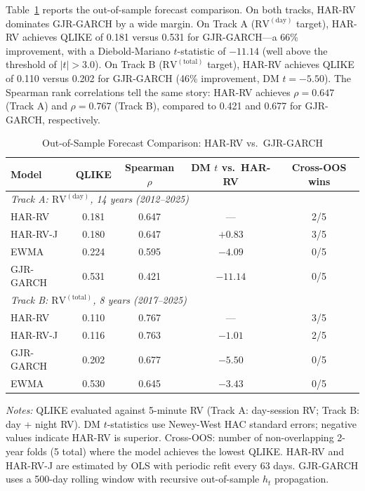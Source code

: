 Table~\ref{tab:har_comparison} reports the out-of-sample forecast comparison. On both tracks, HAR-RV dominates GJR-GARCH by a wide margin. On Track A ($\text{RV}^{(\text{day})}$ target), HAR-RV achieves QLIKE of 0.181 versus 0.531 for GJR-GARCH---a 66\% improvement, with a Diebold-Mariano $t$-statistic of $-11.14$ (well above the \citealt{harvey2016} threshold of $|t| > 3.0$). On Track B ($\text{RV}^{(\text{total})}$ target), HAR-RV achieves QLIKE of 0.110 versus 0.202 for GJR-GARCH (46\% improvement, DM $t = -5.50$). The Spearman rank correlations tell the same story: HAR-RV achieves $\rho = 0.647$ (Track A) and $\rho = 0.767$ (Track B), compared to 0.421 and 0.677 for GJR-GARCH, respectively.

\begin{table}[H]
\centering
\caption{Out-of-Sample Forecast Comparison: HAR-RV vs.\ GJR-GARCH}
\label{tab:har_comparison}
\begin{tabular}{lcccc}
\toprule
Model & QLIKE & Spearman $\rho$ & DM $t$ vs.\ HAR-RV & Cross-OOS wins \\
\midrule
\multicolumn{5}{l}{\textit{Track A: $\text{RV}^{(\text{day})}$, 14 years (2012--2025)}} \\
HAR-RV     & 0.181 & 0.647 & ---     & 2/5 \\
HAR-RV-J   & 0.180 & 0.647 & $+0.83$ & 3/5 \\
EWMA       & 0.224 & 0.595 & $-4.09$ & 0/5 \\
GJR-GARCH  & 0.531 & 0.421 & $-11.14$& 0/5 \\
\midrule
\multicolumn{5}{l}{\textit{Track B: $\text{RV}^{(\text{total})}$, 8 years (2017--2025)}} \\
HAR-RV     & 0.110 & 0.767 & ---     & 3/5 \\
HAR-RV-J   & 0.116 & 0.763 & $-1.01$ & 2/5 \\
GJR-GARCH  & 0.202 & 0.677 & $-5.50$ & 0/5 \\
EWMA       & 0.530 & 0.645 & $-3.43$ & 0/5 \\
\bottomrule
\end{tabular}
\begin{flushleft}
\small \textit{Notes:} QLIKE evaluated against 5-minute RV (Track A: day-session RV; Track B: day + night RV). DM $t$-statistics use Newey-West HAC standard errors; negative values indicate HAR-RV is superior. Cross-OOS: number of non-overlapping 2-year folds (5 total) where the model achieves the lowest QLIKE. HAR-RV and HAR-RV-J are estimated by OLS with periodic refit every 63 days. GJR-GARCH uses a 500-day rolling window with recursive out-of-sample $h_t$ propagation.
\end{flushleft}
\end{table}

